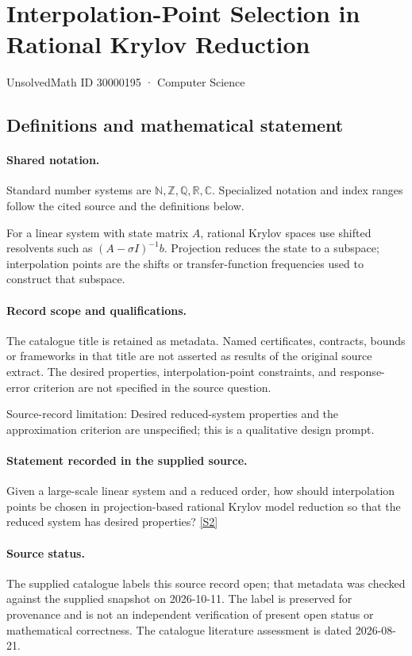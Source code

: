 \documentclass[11pt]{article}
\newcommand{\sref}[2]{\hyperlink{source:#1:#2}{[S#2]}}
\begin{document}
\setcounter{section}{30000194}
\section{Interpolation-Point Selection in Rational Krylov Reduction}\label{30000195}
{\small\sffamily UnsolvedMath ID 30000195 · Computer Science}
\subsection{Definitions and mathematical statement}

\paragraph{Shared notation.}Standard number systems are $\mathbb N,\mathbb Z,\mathbb Q,\mathbb R,\mathbb C$. Specialized notation and index ranges follow the cited source and the definitions below.


For a linear system with state matrix $A$, rational Krylov spaces use shifted resolvents such as $(A-\sigma I)^{-1}b$. Projection reduces the state to a subspace; interpolation points are the shifts or transfer-function frequencies used to construct that subspace.
\paragraph{Record scope and qualifications.}
The catalogue title is retained as metadata. Named certificates, contracts, bounds or frameworks in that title are not asserted as results of the original source extract.
The desired properties, interpolation-point constraints, and response-error criterion are not specified in the source question.

Source-record limitation: Desired reduced-system properties and the approximation criterion are unspecified; this is a qualitative design prompt.
\paragraph{Statement recorded in the supplied source.}
Given a large-scale linear system and a reduced order, how should interpolation points be chosen in projection-based rational Krylov model reduction so that the reduced system has desired properties? \sref{30000195}{2}
\paragraph{Source status.}
The supplied catalogue labels this source record open; that metadata was checked against the supplied snapshot on 2026-10-11. The label is preserved for provenance and is not an independent verification of present open status or mathematical correctness. The catalogue literature assessment is dated 2026-08-21.
\end{document}

